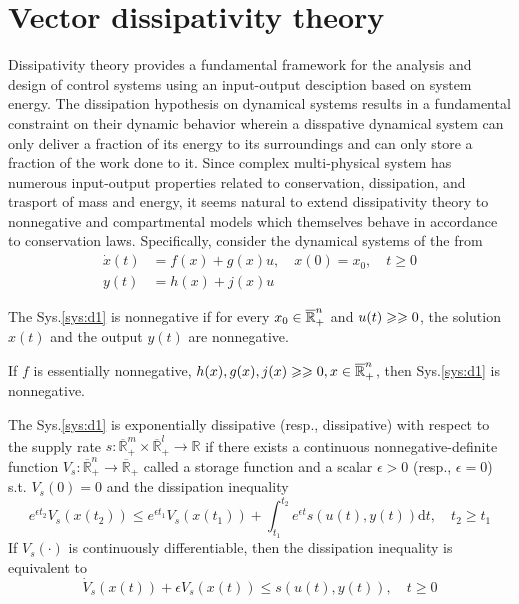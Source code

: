 \documentclass{paper}
\begin{document}
\section{Vector dissipativity theory}
Dissipativity theory provides a fundamental framework for the analysis and design of control systems using an input-output
desciption based on system energy. The dissipation hypothesis on dynamical systems results in a fundamental constraint
on their dynamic behavior wherein a disspative dynamical system can only deliver a fraction of its energy to its surroundings 
and can only store a fraction of the work done to it. Since complex multi-physical system has numerous input-output 
properties related to conservation, dissipation, and trasport of mass and energy, it seems natural to extend dissipativity 
theory to nonnegative and compartmental models which themselves behave in accordance to conservation laws. Specifically, 
consider the dynamical systems of the from
\begin{align}\label{sys:d1} 
\dot{x}(t)&=f(x)+g(x)u, \quad x(0)=x_0, \quad t\geqslant 0 \\
y(t)&=h(x)+j(x)u \nonumber
\end{align}
\begin{defi}
The Sys.\ref{sys:d1} is nonnegative if for every $x_0\in\overline{\mathbb{R}}_{+}^{n}$ and $u(t)\geqslant\geqslant 0$, the solution $x(t)$ and the output $y(t)$ are
nonnegative.
\end{defi}
\begin{prop}
If $f$ is essentially nonnegative, $h(x),g(x),j(x)\geqslant\geqslant 0, x\in \overline{\mathbb{R}}_{+}^{n}$, then Sys.\ref{sys:d1} is nonnegative.
\end{prop}
\begin{defi}
The Sys.\ref{sys:d1} is exponentially dissipative (resp., dissipative) with respect to the supply rate $s:\overline{\mathbb{R}}_{+}^{m}
\times\overline{\mathbb{R}}_{+}^{l}\rightarrow \mathbb{R}$ if there exists a continuous nonnegative-definite function 
$V_s:\overline{\mathbb{R}}_{+}^{n}\rightarrow \overline{\mathbb{R}}_{+}$ called a storage function and a scalar $\epsilon>0$
(resp., $\epsilon=0$) s.t. $V_s(0)=0$ and the dissipation inequality
\begin{equation}
e^{\epsilon t_2}V_s(x(t_2))\leqslant e^{\epsilon t_1}V_s(x(t_1)) + \int_{t_1}^{t_2}e^{\epsilon t}s(u(t),y(t))\text{d}t, \quad t_2\geqslant t_1
\end{equation}
If $V_s(\cdot)$ is continuously differentiable, then the dissipation inequality is equivalent to 
\begin{equation}
\dot{V}_s(x(t))+\epsilon V_s(x(t))\leqslant s(u(t),y(t)), \quad t\geqslant 0
\end{equation}
\end{defi}
\end{document}
